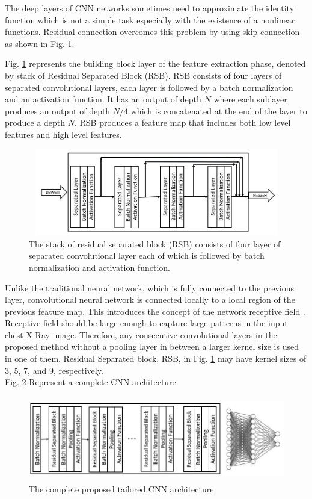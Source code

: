 The deep layers of CNN networks sometimes need to  approximate the identity function which is not a simple task especially  with the existence of a nonlinear functions. Residual connection\cite{resnet} overcomes this problem by using skip connection as shown in Fig. \ref{fig4}.


Fig. \ref{fig4} represents the building block layer of the feature extraction phase, denoted by stack of Residual Separated Block  (RSB). RSB consists of four layers of separated convolutional layers, each layer is followed by a batch normalization and an activation function. It has an output of depth $N$ where each sublayer produces an output of depth $N/4$ which is concatenated at the end of the layer to produce a depth  $N$. RSB produces a feature map that includes both low level features and high level features.

\begin{figure}
\begin{center}
\includegraphics[height=38mm,width=14.0cm]{Figures/fig4.jpg}
\caption{The stack of residual separated block  (RSB) consists of four layer of separated convolutional layer each of which is followed by batch normalization and activation function.}
\label{fig4}
\end{center}
\end{figure}

Unlike the traditional neural network, which is fully connected to the previous layer, convolutional neural network is connected locally to a local region of the previous feature map. This introduces the concept of the network receptive field \cite{receptivefield}. Receptive field should be large enough to capture large patterns in the input chest X-Ray image. Therefore, any consecutive convolutional layers in the proposed method without a pooling layer in between a larger kernel size is used in one of them. Residual Separated block, RSB, in Fig. \ref{fig4} may have kernel sizes of 3, 5, 7, and 9, respectively.\\
Fig. \ref{fig5} Represent a complete CNN architecture.



\begin{figure}
\begin{center}
\includegraphics[height=37mm,width=14.0cm]{Figures/fig5.jpg}
\caption{The complete proposed tailored CNN architecture.}
\label{fig5}
\end{center}
\end{figure}